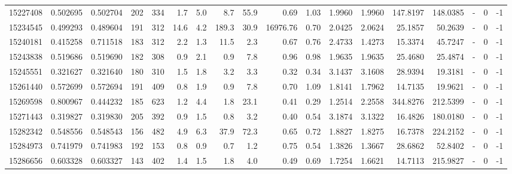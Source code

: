 \begin{tabular}{rrrrrrrrrrrrrrrlrr}
  15227408 & 0.502695 &   0.502704 &  202 &  334 &      1.7 &      5.0 &     8.7 &     55.9 &       0.69 &        1.03 &  1.9960 &  1.9960 &  147.8197 &  148.0385 &             - &        0 &         -1 \\
  15234545 & 0.499293 &   0.489604 &  191 &  312 &     14.6 &      4.2 &   189.3 &     30.9 &   16976.76 &        0.70 &  2.0425 &  2.0624 &   25.1857 &   50.2639 &             - &        0 &         -1 \\
  15240181 & 0.415258 &   0.711518 &  183 &  312 &      2.2 &      1.3 &    11.5 &      2.3 &       0.67 &        0.76 &  2.4733 &  1.4273 &   15.3374 &   45.7247 &             - &        0 &         -1 \\
  15243838 & 0.519686 &   0.519690 &  182 &  308 &      0.9 &      2.1 &     0.9 &      7.8 &       0.96 &        0.98 &  1.9635 &  1.9635 &   25.4680 &   25.4874 &             - &        0 &         -1 \\
  15245551 & 0.321627 &   0.321640 &  180 &  310 &      1.5 &      1.8 &     3.2 &      3.3 &       0.32 &        0.34 &  3.1437 &  3.1608 &   28.9394 &   19.3181 &             - &        0 &         -1 \\
  15261440 & 0.572699 &   0.572694 &  191 &  409 &      0.8 &      1.9 &     0.9 &      7.8 &       0.70 &        1.09 &  1.8141 &  1.7962 &   14.7135 &   19.9621 &             - &        0 &         -1 \\
  15269598 & 0.800967 &   0.444232 &  185 &  623 &      1.2 &      4.4 &     1.8 &     23.1 &       0.41 &        0.29 &  1.2514 &  2.2558 &  344.8276 &  212.5399 &             - &        0 &         -1 \\
  15271443 & 0.319827 &   0.319830 &  205 &  392 &      0.9 &      1.5 &     0.8 &      3.2 &       0.40 &        0.54 &  3.1874 &  3.1322 &   16.4826 &  180.0180 &             - &        0 &         -1 \\
  15282342 & 0.548556 &   0.548543 &  156 &  482 &      4.9 &      6.3 &    37.9 &     72.3 &       0.65 &        0.72 &  1.8827 &  1.8275 &   16.7378 &  224.2152 &             - &        0 &         -1 \\
  15284973 & 0.741979 &   0.741983 &  192 &  153 &      0.8 &      0.9 &     0.7 &      1.2 &       0.75 &        0.54 &  1.3826 &  1.3667 &   28.6862 &   52.8402 &             - &        0 &         -1 \\
  15286656 & 0.603328 &   0.603327 &  143 &  402 &      1.4 &      1.5 &     1.8 &      4.0 &       0.49 &        0.69 &  1.7254 &  1.6621 &   14.7113 &  215.9827 &             - &        0 &         -1 \\

\end{tabular}
